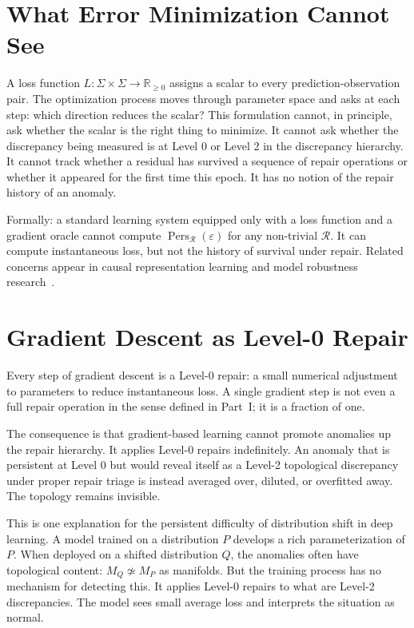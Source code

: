 \documentclass[12pt,oneside]{book}
\theoremstyle{plain}
\theoremstyle{definition}
\theoremstyle{remark}
\DeclareMathOperator{\Pers}{Pers}
\newcommand{\R}{\mathcal{R}}
\newcommand{\eps}{\varepsilon}
\newcommand{\1}{\mathbf{1}}
\begin{document}
\section{What Error Minimization Cannot See}

A loss function $L: \Sigma \times \Sigma \to \mathbb{R}_{\geq 0}$ assigns a scalar to every prediction-observation pair. The optimization process moves through parameter space and asks at each step: which direction reduces the scalar? This formulation cannot, in principle, ask whether the scalar is the right thing to minimize. It cannot ask whether the discrepancy being measured is at Level 0 or Level 2 in the discrepancy hierarchy. It cannot track whether a residual has survived a sequence of repair operations or whether it appeared for the first time this epoch. It has no notion of the repair history of an anomaly.

Formally: a standard learning system equipped only with a loss function and a gradient oracle cannot compute $\Pers_{\R}(\eps)$ for any non-trivial $\R$. It can compute instantaneous loss, but not the history of survival under repair. Related concerns appear in causal representation learning and model robustness research~\cite{pearl2009,verma2018}.

\section{Gradient Descent as Level-0 Repair}

Every step of gradient descent is a Level-0 repair: a small numerical adjustment to parameters to reduce instantaneous loss. A single gradient step is not even a full repair operation in the sense defined in Part~I; it is a fraction of one.

The consequence is that gradient-based learning cannot promote anomalies up the repair hierarchy. It applies Level-0 repairs indefinitely. An anomaly that is persistent at Level 0 but would reveal itself as a Level-2 topological discrepancy under proper repair triage is instead averaged over, diluted, or overfitted away. The topology remains invisible.

This is one explanation for the persistent difficulty of distribution shift in deep learning. A model trained on a distribution $P$ develops a rich parameterization of $P$. When deployed on a shifted distribution $Q$, the anomalies often have topological content: $M_Q \not\simeq M_P$ as manifolds. But the training process has no mechanism for detecting this. It applies Level-0 repairs to what are Level-2 discrepancies. The model sees small average loss and interprets the situation as normal.
\end{document}
